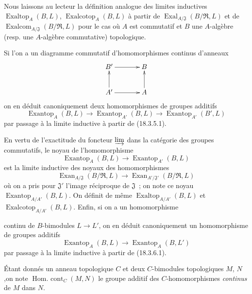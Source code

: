 \begin{env}[18.5.1]
Nous laissons au lecteur la définition analogue des limites inductives
$\operatorname{Exaltop}_A(B,L)$, $\operatorname{Exalcotop}_A(B,L)$ à partir de
$\operatorname{Exal}_{A/\mathfrak J}(B/\mathfrak R,L)$ et de
$\operatorname{Exalcom}_{A/\mathfrak J}(B/\mathfrak R,L)$ pour le cas où $A$
est commutatif et $B$ une $A$-algèbre (resp. une $A$-algèbre commutative)
topologique.
\end{env}

\begin{env}[18.5.2]
\label{0.18.5.2-fr}
Si l'on a un diagramme commutatif d'homomorphismes continus d'anneaux
\[
  \xymatrix@C=3pc@R=2pc{
    B'\ar[r] & B\\
    A'\ar[u]\ar[r] & A\ar[u]
  }
\]
on en déduit canoniquement deux homomorphismes de groupes additifs
\[
  \operatorname{Exantop}_A(B,L)
  \longrightarrow\operatorname{Exantop}_{A'}(B,L)
  \longrightarrow\operatorname{Exantop}_{A'}(B',L)
\]
par passage à la limite inductive à partir de (18.3.5.1).

En vertu de l'exactitude du foncteur $\varinjlim$ dans la catégorie des groupes
commutatifs, le noyau de l'homomorphisme
\[
  \operatorname{Exantop}_A(B,L)
  \longrightarrow\operatorname{Exantop}_{A'}(B,L)
\]
est la limite inductive des noyaux des homomorphismes
\[
  \operatorname{Exan}_{A/\mathfrak J}(B/\mathfrak R,L)
  \longrightarrow
  \operatorname{Exan}_{A'/\mathfrak J'}(B/\mathfrak R,L)
\]
où on a pris pour $\mathfrak J'$ l'image réciproque de $\mathfrak J$~; on note
ce noyau $\operatorname{Exantop}_{A/A'}(B,L)$. On définit de même
$\operatorname{Exaltop}_{A/A'}(B,L)$ et
$\operatorname{Exalcotop}_{A/A'}(B,L)$. Enfin, si on a un homomorphisme


continu de $B$-bimodules $L\to L'$, on en déduit canoniquement un
homomorphisme de groupes additifs
\[
  \operatorname{Exantop}_A(B,L)\longrightarrow
  \operatorname{Exantop}_A(B,L')
\]
par passage à la limite inductive à partir de (18.3.6.1).
\end{env}

\begin{env}[18.5.3]
\label{0.18.5.3-fr}
Étant donnés un anneau topologique $C$ et deux $C$-bimodules topologiques
$M$, $N$,\linebreak on note $\operatorname{Hom.\ cont}_C(M,N)$ le groupe additif des
$C$-homomorphismes \emph{continus} de $M$ dans $N$.
\end{env}

